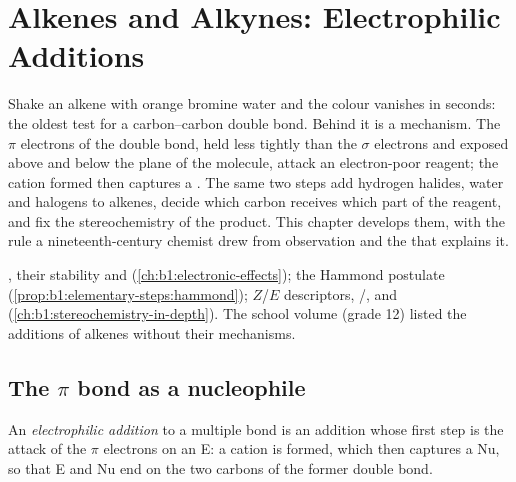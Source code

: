 \chapter{Alkenes and Alkynes: Electrophilic Additions}\label{ch:b1:electrophilic-additions}

Shake an alkene with orange bromine water and the colour vanishes in
seconds: the oldest test for a carbon--carbon double bond. Behind it is a
mechanism. The $\pi$ electrons of the double bond, held less tightly than
the $\sigma$ electrons and exposed above and below the plane of the
molecule, attack an electron-poor reagent; the cation formed then
captures a . The same two steps add hydrogen halides, water
and halogens to alkenes, decide which carbon receives which part of the
reagent, and fix the stereochemistry of the product. This chapter
develops them, with the rule a nineteenth-century chemist drew from
observation and the  that explains it.

\begin{recall}
, their stability and  (\cref{ch:b1:electronic-effects});
the Hammond postulate (\cref{prop:b1:elementary-steps:hammond}); $Z$/$E$
descriptors, /,  and 
(\cref{ch:b1:stereochemistry-in-depth}). The school volume (grade 12)
listed the additions of alkenes without their mechanisms.
\end{recall}

\section{The \texorpdfstring{$\pi$}{pi} bond as a nucleophile}

\begin{definition}\label{def:b1:electrophilic-additions:electrophilic-addition}
An \emph{electrophilic addition} to a
multiple bond is an addition whose first step is the attack of the
$\pi$ electrons on an  E: a cation is formed, which then
captures a  Nu, so that E and Nu end on the two carbons of the
former double bond.
\end{definition}

